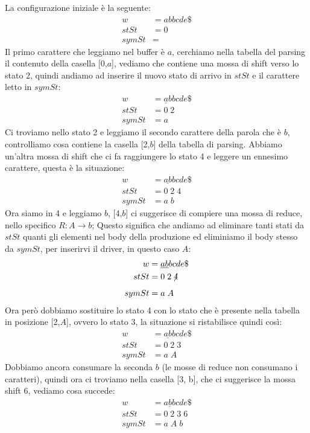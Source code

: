 \documentclass[class=book, crop=false, oneside, 12pt]{standalone}
\begin{document}
La configurazione iniziale è la seguente:
\begin{align*}
    w &= abbcde\$ \\
    stSt &= 0 \\
    symSt &= 
\end{align*}
Il primo carattere che leggiamo nel buffer è \(a\), cerchiamo nella tabella del parsing il contenuto della casella [0,\(a\)], vediamo che contiene una mossa di shift verso lo stato 2, quindi andiamo ad inserire il nuovo stato di arrivo in \(stSt\) e il carattere letto in \(symSt\):
\begin{align*}
    w &= \underline{a}bbcde\$ \\
    stSt &= 0\;2\\
    symSt &= a
\end{align*}
Ci troviamo nello stato 2 e leggiamo il secondo carattere della parola che è \(b\), controlliamo cosa contiene la casella [2,\(b\)] della tabella di parsing.
Abbiamo un'altra mossa di shift che ci fa raggiungere lo stato 4 e leggere un ennesimo carattere, questa è la situazione:
\begin{align*}
    w &= \underline{ab}bcde\$ \\
    stSt &= 0\;2\;4\\
    symSt &= a\;b
\end{align*}
Ora siamo in 4 e leggiamo \(b\), [4,\(b\)] ci suggerisce di compiere una mossa di reduce, nello specifico \(R: A \to b\); Questo significa che andiamo ad eliminare tanti stati da \(stSt\) quanti gli elementi nel body della produzione ed eliminiamo il body stesso da \(symSt\), per inserirvi il driver, in questo caso \(A\):
\begin{align*}
    w &= \underline{ab}bcde\$ \\
    stSt &= 0\;2\;\xout{4}\\
    symSt &= a\;A
\end{align*}
Ora però dobbiamo sostituire lo stato 4 con lo stato che è presente nella tabella in posizione [2,\(A\)], ovvero lo stato 3, la situazione si ristabilisce quindi così:
\begin{align*}
    w &= \underline{ab}bcde\$ \\
    stSt &= 0\;2\;3\\
    symSt &= a\;A
\end{align*}
Dobbiamo ancora consumare la seconda \(b\) (le mosse di reduce non consumano i caratteri), quindi ora ci troviamo nella casella [3, b], che ci suggerisce la mossa shift 6, vediamo cosa succede:
\begin{align*}
    w &= \underline{abb}cde\$ \\
    stSt &= 0\;2\;3\;6\\
    symSt &= a\;A\;b
\end{align*}
\end{document}
